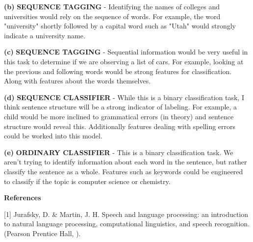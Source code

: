 \documentclass[11pt]{article}
\renewcommand\part[1]{\vspace{.10in}\textbf{(#1)}}
\begin{document}
\part{b} \textbf{SEQUENCE TAGGING} - Identifying the names of colleges and universities would rely on the sequence of words. For example, the word "university" shortly followed by a capital word such as "Utah" would strongly indicate a university name.

\part{c} \textbf{SEQUENCE TAGGING} - Sequential information would be very useful in this task to determine if we are observing a list of cars. For example, looking at the previous and following words would be strong features for classification. Along with features about the words themselves.

\part{d} \textbf{SEQUENCE CLASSIFIER} - While this is a binary classification task, I think sentence structure will be a strong indicator of labeling. For example, a child would be more inclined to grammatical errors (in theory) and sentence structure would reveal this. Additionally features dealing with spelling errors could be worked into this model.

\part{e} \textbf{ORDINARY CLASSIFIER} - This is a binary classification task. We aren't trying to identify information about each word in the sentence, but rather classify the sentence as a whole. Features such as keywords could be engineered to classify if the topic is computer science or chemistry.

\newpage

\textbf{References}

[1] Jurafsky, D. \& Martin, J. H. Speech and language processing: an introduction to natural \null\qquad language processing, computational linguistics, and speech recognition. (Pearson Prentice Hall, \null{}).
\end{document}

